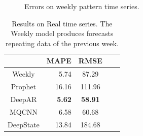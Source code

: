 \documentclass[a4paper, 12pt]{article} %
\newcommand{\ra}[1]{\renewcommand{\arraystretch}{#1}}
\begin{document}
	
	\begin{figure}\centering
		 \hfill
		
		\caption{Errors on weekly pattern time series.}
		\label{fig:results_forecasting_bank}
	\end{figure}
	
	\begin{table}\centering 
		\ra{1.3}
		\begin{tabular}{@{}crcrc@{}}
			\midrule
			& MAPE & RMSE\\
			\midrule
			Weekly & 5.74 & 87.29\\
			Prophet & 16.16 & 111.96\\
			DeepAR & \textbf{5.62} & \textbf{58.91}\\
			MQCNN & 6.58 & 60.68\\
			DeepState & 13.84 & 184.68\\
			\bottomrule
		\end{tabular}
		\caption{Results on Real time series. The Weekly model produces forecasts repeating data of the previous week.} \label{table:results_forecasting_bank}
	\end{table}
\end{document}
